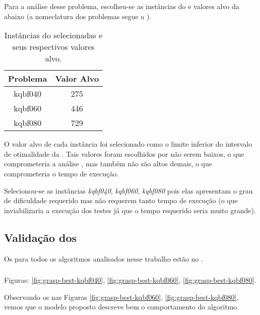 Para a análise desse problema, escolheu-se as instâncias do \maxkqbf e valores alvo da  abaixo (a nomeclatura dos problemas segue a ).

\begin{table}[H]
    \centering
    \begin{tabular}{|c|c|}
        \hline
        \textbf{Problema} & \textbf{Valor Alvo} \\\hline
        kqbf040           & 275                 \\\hline
        kqbf060           & 446                 \\\hline
        kqbf080           & 729                 \\\hline
    \end{tabular}
    \caption{Instâncias do \maxkqbf selecionadas e seus respectivos valores alvo.}
    \label{tab:problem-target-value}
\end{table}

O valor alvo de cada instância foi selecionado como o limite inferior do intervalo de otimalidade da . Tais valores foram escolhidos por não serem baixos, o que comprometeria a análise \cite{bib:ttt}, mas também não são altos demais, o que comprometeria o tempo de execução.

Selecionou-se as instâncias \textit{kqbf040}, \textit{kqbf060}, \textit{kqbf080} pois elas apresentam o grau de dificuldade requerido mas não requerem tanto tempo de execução (o que inviabilizaria a execução dos testes já que o tempo requerido seria muito grande).

\subsection{Validação dos \ttt}
\label{subsection:ttt-validation}

Os \ttt para todos os algoritmos analisados nesse trabalho estão no .

\subsubsection{\graspBest}
\label{subsubsection:ttt-validation-grasp-best}

Figuras: \ref{fig:grasp-best-kqbf040}, \ref{fig:grasp-best-kqbf060},
\ref{fig:grasp-best-kqbf080}.

Observando os \qq nas Figuras \ref{fig:grasp-best-kqbf060}, \ref{fig:grasp-best-kqbf080}, vemos que o modelo proposto descreve bem o comportamento do algoritmo.


